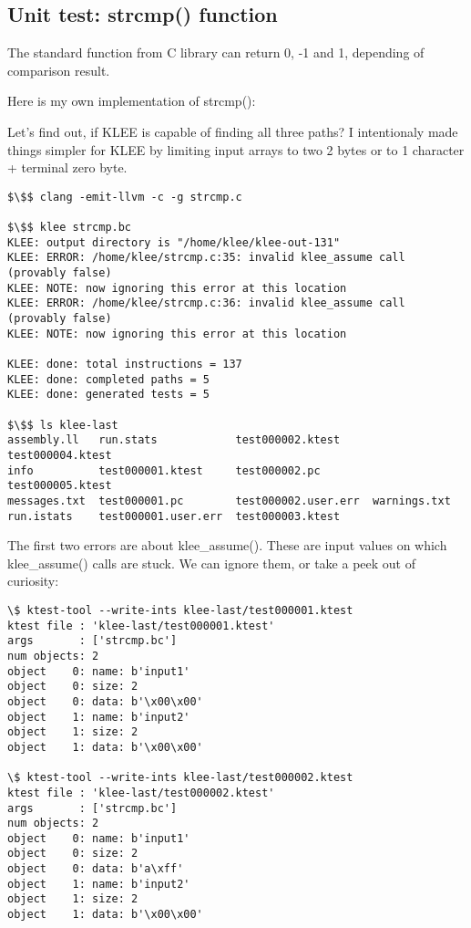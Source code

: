 \subsection{Unit test: strcmp() function}

The standard  function from C library can return 0, -1 and 1, depending of comparison result.

Here is my own implementation of strcmp():



Let's find out, if KLEE is capable of finding all three paths?
I intentionaly made things simpler for KLEE by limiting input arrays to two 2 bytes or to 1 character + terminal zero byte.

\begin{lstlisting}[basicstyle=\ttfamily, mathescape]
$\$$ clang -emit-llvm -c -g strcmp.c

$\$$ klee strcmp.bc
KLEE: output directory is "/home/klee/klee-out-131"
KLEE: ERROR: /home/klee/strcmp.c:35: invalid klee_assume call (provably false)
KLEE: NOTE: now ignoring this error at this location
KLEE: ERROR: /home/klee/strcmp.c:36: invalid klee_assume call (provably false)
KLEE: NOTE: now ignoring this error at this location

KLEE: done: total instructions = 137
KLEE: done: completed paths = 5
KLEE: done: generated tests = 5

$\$$ ls klee-last
assembly.ll   run.stats            test000002.ktest     test000004.ktest
info          test000001.ktest     test000002.pc        test000005.ktest
messages.txt  test000001.pc        test000002.user.err  warnings.txt
run.istats    test000001.user.err  test000003.ktest
\end{lstlisting}

The first two errors are about klee\_assume().
These are input values on which klee\_assume() calls are stuck.
We can ignore them, or take a peek out of curiosity:

\begin{lstlisting}
\$ ktest-tool --write-ints klee-last/test000001.ktest
ktest file : 'klee-last/test000001.ktest'
args       : ['strcmp.bc']
num objects: 2
object    0: name: b'input1'
object    0: size: 2
object    0: data: b'\x00\x00'
object    1: name: b'input2'
object    1: size: 2
object    1: data: b'\x00\x00'

\$ ktest-tool --write-ints klee-last/test000002.ktest
ktest file : 'klee-last/test000002.ktest'
args       : ['strcmp.bc']
num objects: 2
object    0: name: b'input1'
object    0: size: 2
object    0: data: b'a\xff'
object    1: name: b'input2'
object    1: size: 2
object    1: data: b'\x00\x00'
\end{lstlisting}

